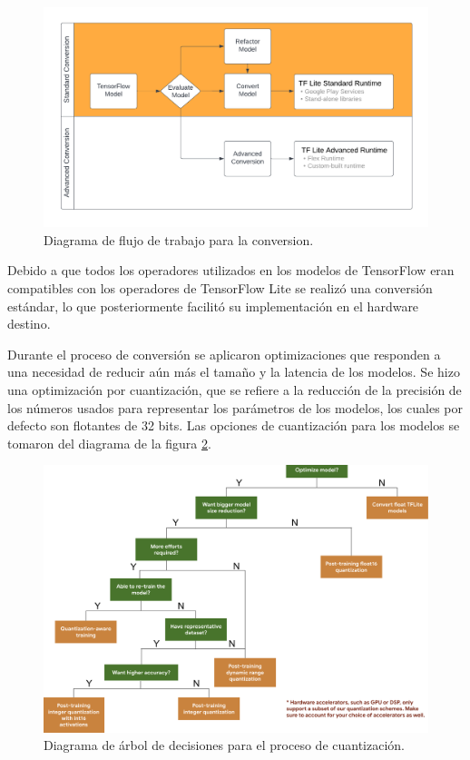 \begin{figure}[h]
	\centering
	\includegraphics[scale=0.6]{./Figures/tf_convert_workflow_diag.png}
	\caption{Diagrama de flujo de trabajo para la conversion\protect\footnotemark.}
	\label{fig:tf2tflite_workflow}
\end{figure}

Debido a que todos los operadores utilizados en los modelos de TensorFlow eran compatibles con los operadores de TensorFlow Lite se realizó una conversión estándar, lo que posteriormente facilitó su implementación en el hardware destino.

Durante el proceso de conversión se aplicaron optimizaciones que responden a una necesidad de reducir aún más el tamaño y la latencia de los modelos. Se hizo una optimización por cuantización, que se refiere a la reducción de la precisión de los números usados para representar los parámetros de los modelos, los cuales por defecto son flotantes de 32 bits. Las opciones de cuantización para los modelos se tomaron del diagrama de la figura \ref{fig:tf_quantization_tree}.

\begin{figure}[h]
	\centering
	\includegraphics[scale=0.3]{./Figures/tf_quantization_decision_tree.png}
	\caption{Diagrama de árbol de decisiones para el proceso de cuantización\protect\footnotemark.}
	\label{fig:tf_quantization_tree}
\end{figure}

